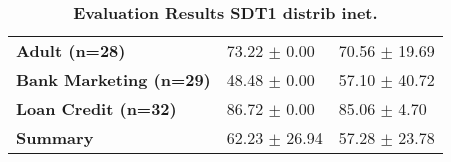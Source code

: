 \begin{table}[htb]
{\begin{tabular}{lll}
\textbf{Adult (n=28)                             } &        \phantom{0}73.22 $\pm$ \phantom{0}0.00 &                      \phantom{0}70.56 $\pm$ 19.69 \\
\textbf{Bank Marketing (n=29)                    } &        \phantom{0}48.48 $\pm$ \phantom{0}0.00 &                      \phantom{0}57.10 $\pm$ 40.72 \\
\textbf{Loan Credit (n=32)                       } &        \phantom{0}86.72 $\pm$ \phantom{0}0.00 &            \phantom{0}85.06 $\pm$ \phantom{0}4.70 \\
\midrule
\textbf{Summary                                  } &                  \phantom{0}62.23 $\pm$ 26.94 &                      \phantom{0}57.28 $\pm$ 23.78 \\
\bottomrule
\end{tabular}%
}
\caption{\textbf{Evaluation Results SDT1 distrib inet.}}
\label{tab:eval-results}
\end{table}


